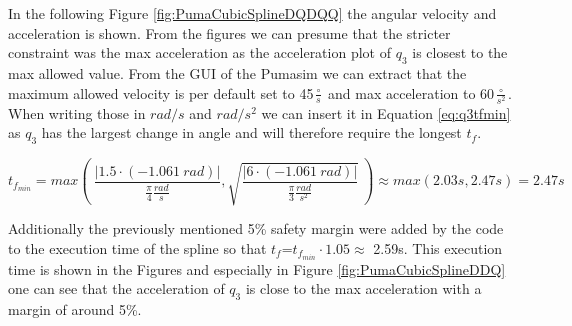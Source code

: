In the following Figure \ref{fig:PumaCubicSplineDQDQQ} the angular velocity and acceleration is shown. From the figures we can presume that the stricter constraint was the max acceleration as the acceleration plot of $q_3$ is closest to the max allowed value.
From the GUI of the Pumasim we can extract that the maximum allowed velocity is per default set to 45$\frac{\circ}{s}$ and max acceleration to 60$\frac{\circ}{s^2}$. When writing those in $rad/s$ and $rad/s^2$ we can insert it in Equation \ref{eq:q3tfmin} as $q_3$ has the largest change in angle and will therefore require the longest $t_f$. 

\begin{equation}
    t_{f_{min}}
    =max(\ \frac{|1.5\cdot(-1.061\ rad)|}{\frac{\pi}{4}\frac{rad}{s}}, \sqrt{\frac{|6\cdot(-1.061\ rad)|}{\frac{\pi}{3}\frac{rad}{s^2}}}\ ) \approx max(2.03s, 2.47s) =  2.47s
\end{equation}

Additionally the previously mentioned 5\% safety margin were added by the code to the execution time of the spline so that $t_f$=$ t_{f_{min}}\cdot 1.05\approx$ 2.59s. This execution time is shown in the Figures and especially in Figure \ref{fig:PumaCubicSplineDDQ} one can see that the acceleration of $q_3$ is close to the max acceleration with a margin of around 5\%.

